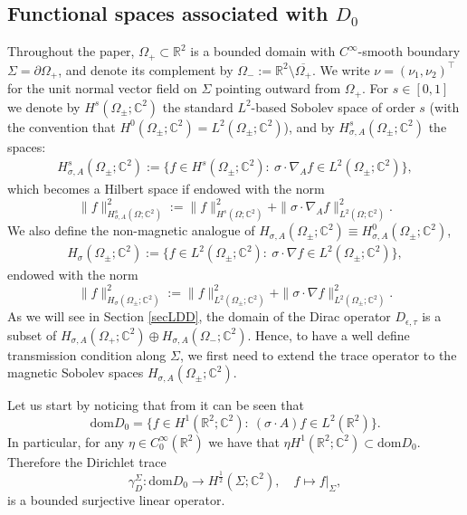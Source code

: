 \documentclass[11pt,a4paper,reqno,oneside]{amsproc}
\DeclareMathOperator{\dom}{dom}
\def \cc {{\mathbb C}}
\numberwithin{equation}{section}
\def\dom{\mathrm{dom}}
\def \cc {{\mathbb{C}}}
\begin{document}
\subsection{Functional spaces associated with $D_0$} 
Throughout the paper, $\Omega_+ \subset \mathbb{R}^2$ is a bounded domain with $C^\infty$-smooth boundary $\Sigma=\partial\Omega_+$, and denote its complement by   $\Omega_- := \mathbb R^2 \setminus \overline{\Omega_+}$. We write $\nu=(\nu_1,\nu_2)^\top$ for the unit normal vector field on $ \Sigma$  pointing outward from $\Omega_+$. For $s\in[0,1]$ we denote by $H^{s}(\Omega_\pm;\cc^2)$ the standard $L^2$-based Sobolev space of order $s$ (with the convention that $H^{0}(\Omega_\pm;\cc^2)=L^{2}(\Omega_\pm;\cc^2)$),  and  by $H^s_{\sigma, A}(\Omega_\pm; \cc^2)$ the spaces:
\begin{align*}%
		H^s_{\sigma, A}(\Omega_\pm; \cc^2):=\Big\{f\in H^s(\Omega_\pm; \cc^2):\ \sigma\cdot\nabla_A f\in L^2(\Omega_\pm; \cc^2)
		\Big\},
	\end{align*}
	which becomes a Hilbert space if endowed with the norm
	\[
	\| f\|^2_{H^s_{\sigma, A}(\Omega;\cc^2)}:= \| f\|^2_{H^s(\Omega;\cc^2)}+ \|\sigma\cdot\nabla_A f\|^2_{L^{2}(\Omega;\cc^2)}.
	\]
 We also define the non-magnetic analogue of $H_{\sigma, A}(\Omega_\pm;\cc^2)\equiv H^0_{\sigma, A}(\Omega_\pm;\cc^2)$,
	\begin{align*}%
		H_{\sigma}(\Omega_\pm; \cc^2):=\Big\{f\in L^2(\Omega_\pm; \cc^2):\ \sigma\cdot\nabla f\in L^2(\Omega_\pm; \cc^2)
		\Big\},
	\end{align*}
 endowed with the norm
	\[
	\| f\|^2_{H_{\sigma}(\Omega_\pm;\cc^2)}:= \| f\|^2_{L^2(\Omega_\pm;\cc^2)}+ \|\sigma\cdot\nabla f\|^2_{L^{2}(\Omega_\pm;\cc^2)}.
	\]
	As we will see in Section \ref{secLDD}, the domain of the Dirac operator $D_{\epsilon,\tau}$ is a subset of $H_{\sigma, A}(\Omega_+; \cc^2)\oplus H_{\sigma, A}(\Omega_-; \cc^2)$. Hence,  to have a well define transmission condition along $\Sigma$, we first need to extend  the trace operator to the magnetic Sobolev spaces $H_{\sigma, A}(\Omega_\pm;\cc^2)$. 

Let us start by noticing that from \cite[Theorem 1.24]{BLRS23} it can be seen that 
\[
\dom D_0=\{ f\in H^1(\mathbb R^2; \cc^2):\ (\sigma\cdot A ) f\in L^2(\mathbb R^2)\}.
\]
In particular, for any $\eta \in C_0^\infty(\mathbb R^2)$   we have that $\eta H^1(\mathbb R^2; \cc^2)\subset \dom D_0.$  Therefore  the Dirichlet trace 
\[
\gamma_D^\Sigma: \dom D_0\longrightarrow H^{\frac{1}{2}}(\Sigma;\cc^2), \quad  f\mapsto f|_{\Sigma}, 
\] 
is a bounded surjective linear operator.
\end{document}
